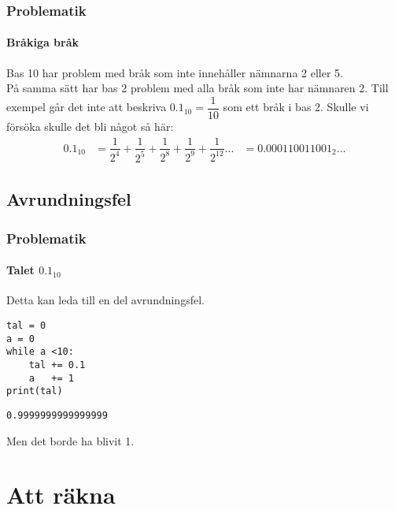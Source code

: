 \documentclass[aspectratio=169]{beamer}
\begin{document}
\begin{frame}
	\frametitle{Problematik}
	\framesubtitle{Bråkiga bråk}
	
	Bas 10 har problem med bråk som inte innehåller nämnarna 2 eller 5.\\
	På samma sätt har bas 2 problem med alla bråk som inte har nämnaren 2. Till exempel går det inte att beskriva \( 0.1_{10}=\dfrac{1}{10} \) som ett bråk i bas 2. Skulle vi försöka skulle det bli något så här:
	\[
		\begin{aligned}
		 0.1_{10} 	& = \dfrac{1}{2^4}+ \dfrac{1}{2^5}+\dfrac{1}{2^8}+\dfrac{1}{2^9}+\dfrac{1}{2^{12}}... 
		  		& = 0.000110011001_2...
		 \end{aligned}
	 \]
\end{frame}
 
\subsection{Avrundningsfel}
 
\begin{frame}[fragile]
	\frametitle{Problematik}
	\framesubtitle{Talet \(0.1_{10}\) }
	
	Detta kan leda till en del avrundningsfel.
	
	\begin{lstlisting}
tal = 0
a = 0
while a <10:
    tal += 0.1
    a   += 1
print(tal)
	\end{lstlisting}
	
	\begin{lstlisting}
0.9999999999999999
	\end{lstlisting}
	Men det borde ha blivit 1.
\end{frame}

\section{Att räkna}
\end{document}
